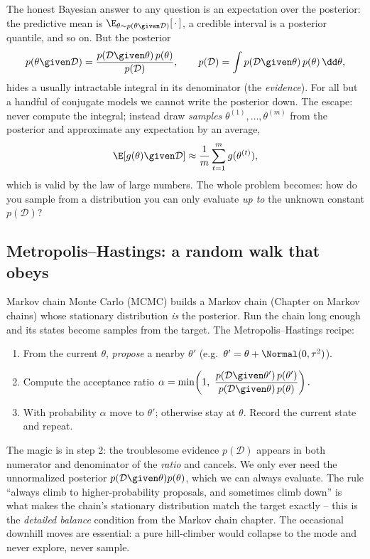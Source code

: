 The honest Bayesian answer to any question is an expectation over the posterior:
the predictive mean is $\E_{\theta\sim p(\theta\given\mathcal{D})}[\,\cdot\,]$, a
credible interval is a posterior quantile, and so on. But the posterior
\[
  p(\theta\given\mathcal{D}) = \frac{p(\mathcal{D}\given\theta)\,p(\theta)}{p(\mathcal{D})},
  \qquad p(\mathcal{D}) = \int p(\mathcal{D}\given\theta)\,p(\theta)\,\dd\theta,
\]
hides a usually intractable integral in its denominator (the
\emph{evidence}). For all but a handful of conjugate models we cannot write the
posterior down. The escape: never compute the integral; instead draw
\emph{samples} $\theta^{(1)},\dots,\theta^{(m)}$ from the posterior and
approximate any expectation by an average,
\[
  \E[g(\theta)\given\mathcal{D}] \approx \frac{1}{m}\sum_{t=1}^m g(\theta^{(t)}),
\]
which is valid by the law of large numbers. The whole problem becomes: how do you
sample from a distribution you can only evaluate \emph{up to} the unknown constant
$p(\mathcal{D})$?

\subsection{Metropolis--Hastings: a random walk that obeys}

Markov chain Monte Carlo (MCMC) builds a Markov chain (Chapter on Markov chains)
whose stationary distribution \emph{is} the posterior. Run the chain long enough
and its states become samples from the target. The Metropolis--Hastings recipe:

\begin{enumerate}
  \item From the current $\theta$, \emph{propose} a nearby $\theta'$ (e.g.\
  $\theta' = \theta + \Normal(0,\tau^2)$).
  \item Compute the acceptance ratio
  $\displaystyle \alpha = \min\!\left(1,\ \frac{p(\mathcal{D}\given\theta')\,p(\theta')}
       {p(\mathcal{D}\given\theta)\,p(\theta)}\right).$
  \item With probability $\alpha$ move to $\theta'$; otherwise stay at $\theta$.
  Record the current state and repeat.
\end{enumerate}

\begin{happeningbox}
The magic is in step 2: the troublesome evidence $p(\mathcal{D})$ appears in both
numerator and denominator of the \emph{ratio} and cancels. We only ever need the
unnormalized posterior $p(\mathcal{D}\given\theta)p(\theta)$, which we can always
evaluate. The rule ``always climb to higher-probability proposals, and sometimes
climb down'' is what makes the chain's stationary distribution match the target
exactly -- this is the \emph{detailed balance} condition from the Markov chain
chapter. The occasional downhill moves are essential: a pure hill-climber would
collapse to the mode and never explore, never sample.
\end{happeningbox}

